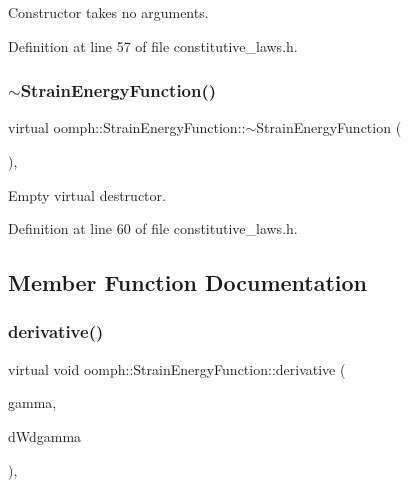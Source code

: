 Constructor takes no arguments. 



Definition at line 57 of file constitutive\+\_\+laws.\+h.

\mbox{\label{classoomph_1_1StrainEnergyFunction_a755d306f96fc59147c6cb148456e364e}} 
\subsubsection{\texorpdfstring{$\sim$\+Strain\+Energy\+Function()}{~StrainEnergyFunction()}}
{\footnotesize\ttfamily virtual oomph\+::\+Strain\+Energy\+Function\+::$\sim$\+Strain\+Energy\+Function (\begin{DoxyParamCaption}{ }\end{DoxyParamCaption})\hspace{0.3cm}{\ttfamily [inline]}, {\ttfamily [virtual]}}



Empty virtual destructor. 



Definition at line 60 of file constitutive\+\_\+laws.\+h.



\subsection{Member Function Documentation}
\mbox{\label{classoomph_1_1StrainEnergyFunction_a467a3b01986940aba8c8aff2715bf086}} 
\subsubsection{\texorpdfstring{derivative()}{derivative()}}
{\footnotesize\ttfamily virtual void oomph\+::\+Strain\+Energy\+Function\+::derivative (\begin{DoxyParamCaption}\item[{const \hyperlink{classoomph_1_1DenseMatrix}{Dense\+Matrix}$<$ double $>$ \&}]{gamma,  }\item[{\hyperlink{classoomph_1_1DenseMatrix}{Dense\+Matrix}$<$ double $>$ \&}]{d\+Wdgamma }\end{DoxyParamCaption})\hspace{0.3cm}{\ttfamily [inline]}, {\ttfamily [virtual]}}



